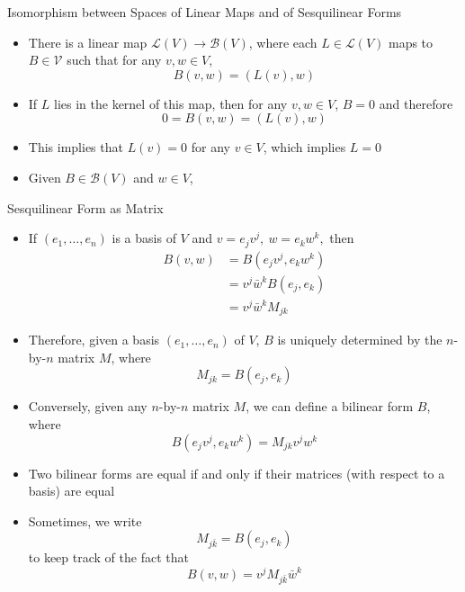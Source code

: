 \documentclass[usenames,dvipsnames,10pt]{beamer}
\begin{document}
\begin{frame}
  {Isomorphism between Spaces of Linear Maps and of Sesquilinear Forms}

  \begin{itemize}
  \item There is a linear map $\mathcal{L}(V) \rightarrow \mathcal{B}(V)$, where each $L \in \mathcal{L}(V)$ maps to $B \in \mathcal{V}$ such that for any $v,w \in V$,
    \[ B(v,w) = (L(v),w) \]
  \item If $L$ lies in the kernel of this map, then for any $v,w \in V$, $B = 0$ and therefore
    \[ 0 = B(v,w) = (L(v),w) \]
  \item This implies that $L(v) = 0$ for any $v \in V$, which implies $L = 0$
  \item Given $B \in \mathcal{B}(V)$ and $w \in V$, 
  \end{itemize}
\end{frame}


\begin{frame}
  {Sesquilinear Form as Matrix}

  \begin{itemize}
  \item If $(e_1, \dots, e_n)$ is a basis of $V$ and $v = e_jv^j,\ w = e_kw^k,$
    then
    \begin{align*}
      B(v,w) &= B(e_jv^j, e_kw^k)\\
             &= v^j\bar{w}^kB(e_j,e_k)\\
             &= v^j\bar{w}^kM_{jk}
    \end{align*}
  \item Therefore, given a basis $(e_1, \dots, e_n)$ of $V$, $B$ is uniquely determined by the $n$-by-$n$ matrix $M$, where
    \[ M_{jk} = B(e_j,e_k) \]
  \item Conversely, given any $n$-by-$n$ matrix $M$, we can define a bilinear form $B$, where
    \[
      B(e_jv^j,e_kw^k) = M_{jk}v^jw^k
    \]
  \item Two bilinear forms are equal if and only if their matrices (with respect to a basis) are equal
  \item Sometimes, we write
    \[  M_{j\bar{k}} = B(e_j,e_k) \]
    to keep track of the fact that
    \[
      B(v,w) = v^jM_{j\bar{k}}\bar{w}^k
    \]
  \end{itemize}
\end{frame}
\end{document}
